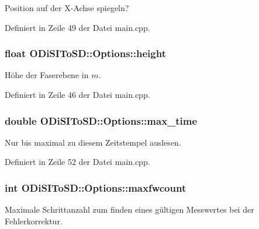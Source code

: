 Position auf der X-\/\-Achse spiegeln? 



Definiert in Zeile 49 der Datei main.\-cpp.

\hypertarget{structODiSIToSD_1_1Options_af91210949f20d204dfea863766b53f9f}{
\subsubsection[{height}]{\setlength{\rightskip}{0pt plus 5cm}float O\-Di\-S\-I\-To\-S\-D\-::\-Options\-::height}}\label{structODiSIToSD_1_1Options_af91210949f20d204dfea863766b53f9f}


Höhe der Faserebene in $m$. 



Definiert in Zeile 46 der Datei main.\-cpp.

\hypertarget{structODiSIToSD_1_1Options_a43185fa84affbd5e878ea336e15e1038}{
\subsubsection[{max\-\_\-time}]{\setlength{\rightskip}{0pt plus 5cm}double O\-Di\-S\-I\-To\-S\-D\-::\-Options\-::max\-\_\-time}}\label{structODiSIToSD_1_1Options_a43185fa84affbd5e878ea336e15e1038}


Nur bis maximal zu diesem Zeitstempel auslesen. 



Definiert in Zeile 52 der Datei main.\-cpp.

\hypertarget{structODiSIToSD_1_1Options_a03f0d8cd1ad0cbcaf9f3cee8ca6d536f}{
\subsubsection[{maxfwcount}]{\setlength{\rightskip}{0pt plus 5cm}int O\-Di\-S\-I\-To\-S\-D\-::\-Options\-::maxfwcount}}\label{structODiSIToSD_1_1Options_a03f0d8cd1ad0cbcaf9f3cee8ca6d536f}


Maximale Schrittanzahl zum finden eines gültigen Messwertes bei der Fehlerkorrektur. 



